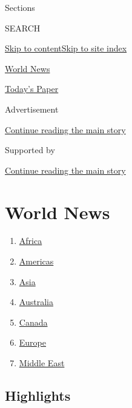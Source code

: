 Sections

SEARCH

\protect\hyperlink{site-content}{Skip to
content}\protect\hyperlink{site-index}{Skip to site index}

\href{https://www.nytimes3xbfgragh.onion/section/world}{World News}

\href{https://myaccount.nytimes3xbfgragh.onion/auth/login?response_type=cookie\&client_id=vi}{}

\href{https://www.nytimes3xbfgragh.onion/section/todayspaper}{Today's
Paper}

Advertisement

\protect\hyperlink{after-top}{Continue reading the main story}

Supported by

\protect\hyperlink{after-sponsor}{Continue reading the main story}

\hypertarget{world-news}{%
\section{World News}\label{world-news}}

\begin{enumerate}
\def\labelenumi{\arabic{enumi}.}
\tightlist
\item
  \href{/section/world/africa}{Africa}
\item
  \href{/section/world/americas}{Americas}
\item
  \href{/section/world/asia}{Asia}
\item
  \href{/section/world/australia}{Australia}
\item
  \href{/section/world/canada}{Canada}
\item
  \href{/section/world/europe}{Europe}
\item
  \href{/section/world/middleeast}{Middle East}
\end{enumerate}

\hypertarget{highlights}{%
\subsection{Highlights}\label{highlights}}

